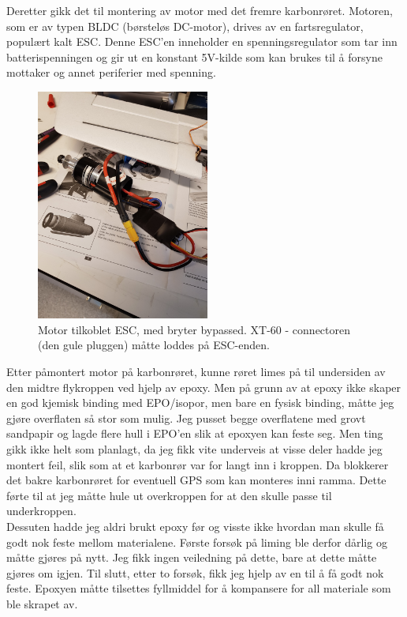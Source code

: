 \documentclass[12pt, a4paper]{report}
\begin{document}
\newpage
Deretter gikk det til montering av motor med det fremre karbonrøret. Motoren, som er av typen BLDC (børsteløs DC-motor), drives av en fartsregulator, populært kalt ESC. Denne ESC'en inneholder en spenningsregulator som tar inn batterispenningen og gir ut en konstant 5V-kilde som kan brukes til å forsyne mottaker og annet periferier med spenning. 

\begin{figure}[ht]
	\centering
	\includegraphics[height=7.6cm, width = .55\textwidth]{bilder/esc_og_motor.jpg}
	\caption{Motor tilkoblet ESC, med bryter bypassed. XT-60 - connectoren (den gule pluggen) måtte loddes på ESC-enden.}
\end{figure}

\newpage
Etter påmontert motor på karbonrøret, kunne røret limes på til undersiden av den midtre flykroppen ved hjelp av epoxy. Men på grunn av at epoxy ikke skaper en god kjemisk binding med EPO/isopor, men bare en fysisk binding, måtte jeg gjøre overflaten så stor som mulig. Jeg pusset begge overflatene med grovt sandpapir og lagde flere hull i EPO'en slik at epoxyen kan feste seg. 
Men ting gikk ikke helt som planlagt, da jeg fikk vite underveis at visse deler hadde jeg montert feil, slik som at et karbonrør var for langt inn i kroppen. Da blokkerer det bakre karbonrøret for eventuell GPS som kan monteres inni ramma. Dette førte til at jeg måtte hule ut overkroppen for at den skulle passe til underkroppen. \\
Dessuten hadde jeg aldri brukt epoxy før og visste ikke hvordan man skulle få godt nok feste mellom materialene. Første forsøk på liming ble derfor dårlig og måtte gjøres på nytt. Jeg fikk ingen veiledning på dette, bare at dette måtte gjøres om igjen. Til slutt, etter to forsøk, fikk jeg hjelp av en til å få godt nok feste. Epoxyen måtte tilsettes fyllmiddel for å kompansere for all materiale som ble skrapet av. \\
\end{document}
